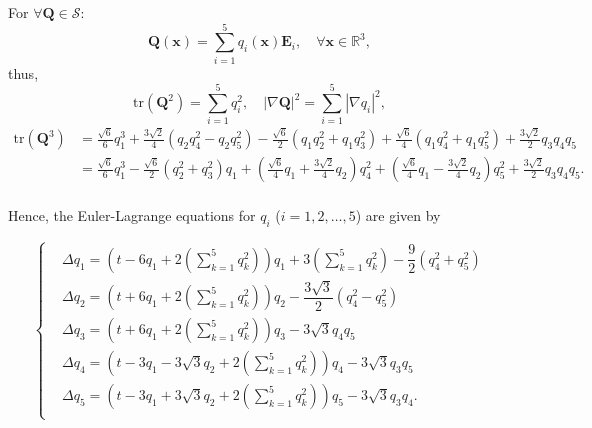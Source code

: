 \documentclass[10pt, a4paper]{article}
\newcommand\x{\mathbf{x}}
\newcommand\Qvec{\mathbf{Q}}
\newcommand\E{\mathbf{E}}
\newcommand\tr{\mathrm{tr}}
\begin{document}
For $\forall \Qvec \in \mathcal{S}$:
\begin{equation}
\Qvec(\x) = \sum_{i = 1}^{5} q_i(\x) \E_i , \quad \forall \x \in \mathbb{R}^3,
\end{equation}
thus,
\begin{equation}
\tr(\Qvec^2) = \sum_{i = 1}^5 q_i^2, \quad |\nabla \Qvec|^2 = \sum_{i = 1}^5 |\nabla q_i|^2,
\end{equation}
\begin{equation}
\begin{aligned}
\tr (\Qvec^3) & = \frac{\sqrt{6}}{6}q_1^3 + \frac{3\sqrt{2}}{4}(q_2q_4^2 - q_2q_5^2) - \frac{\sqrt{6}}{2}(q_1q_2^2 + q_1q_3^2) + \frac{\sqrt{6}}{4}(q_1q_4^2 + q_1q_5^2) + \frac{3\sqrt{2}}{2}q_3q_4q_5 \\
& = \frac{\sqrt{6}}{6}q_1^3 - \frac{\sqrt{6}}{2}(q_2^2 + q_3^2)q_1 + (\frac{\sqrt{6}}{4}q_1 + \frac{3\sqrt{2}}{4}q_2) q_4^2 + (\frac{\sqrt{6}}{4} q_1 - \frac{3\sqrt{2}}{4} q_2) q_5^2 + \frac{3\sqrt{2}}{2}q_3q_4q_5. \\
\end{aligned}
\end{equation}

\iffalse
\begin{equation}
  \begin{aligned}
  & \frac{\sqrt{6}}{6} q_1^3 + \frac{3 \sqrt{2}}{4} q_2 q_4^2 - \frac{3 \sqrt{2}}{4} q_2 q_5^2 \\
    & - \frac{\sqrt{6}}{2} q_1 q_2^2 - \frac{\sqrt{6}}{2}q_1 q_3^2  +  \frac{\sqrt{6}}{4} q_1 q_4^2 \\
    & +  \frac{\sqrt{6}}{4} q_1 q_5^2 + \frac{3 \sqrt{2}}{2} q_3 q_4 q_5 \\
    \end{aligned}
\end{equation}
\fi


Hence,
the Euler-Lagrange equations for $q_i$ ($i = 1, 2, \ldots, 5$) are given by

\begin{equation}\label{eq_qi_b}
\begin{cases}
  & \Delta q_1 =  \left( t - 6 q_1 + 2 (\sum_{k = 1}^5 q_k^2) \right) q_1 + 3 ( \sum_{k = 1}^5 q_k^2) - \dfrac{9}{2} (q_4^2 + q_5^2) \\
  & \Delta q_2 =  \left( t + 6 q_1 + 2 (\sum_{k = 1}^5 q_k^2) \right) q_2 - \dfrac{3\sqrt{3}}{2}(q_4^2 - q_5^2)  \\
  & \Delta q_3 =  \left( t + 6 q_1 + 2 (\sum_{k = 1}^5 q_k^2) \right) q_3  - 3 \sqrt{3} q_4 q_5 \\
  & \Delta q_4 =  \left( t - 3 q_1 - 3 \sqrt{3} q_2 + 2 (\sum_{k = 1}^5 q_k^2) \right) q_4 - 3 \sqrt{3} q_3 q_5 \\
  & \Delta q_5 =  \left( t - 3 q_1 + 3 \sqrt{3} q_2 + 2 (\sum_{k = 1}^5 q_k^2) \right) q_5 - 3 \sqrt{3} q_3 q_4. \\ 
\end{cases}
\end{equation}
\end{document}
